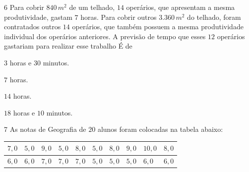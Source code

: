 \num{6}  Para cobrir $840\,m^2$ de um telhado, $14$ operários, que apresentam a
mesma produtividade, gastam $7$ horas. Para cobrir outros $3.360\,m^2$ do
telhado, foram contratados outros $14$ operários, que também possuem a
mesma produtividade individual dos operários anteriores. A previsão de
tempo que esses $12$ operários gastariam para realizar esse trabalho É de

\begin{escolha}
\item $3$ horas e $30$ minutos.
\item $7$ horas.
\item $14$ horas.
\item $18$ horas e $10$ minutos.
\end{escolha}




\num{7}  As notas de Geografia de $20$ alunos foram colocadas na tabela abaixo:


\begin{longtable}[]{@{}llllllllll@{}}
\toprule
$7,0$ & $5,0$ & $9,0$ & $5,0$ & $8,0$ & $5,0$ & $8,0$ & $9,0$ & $10,0$ &
$8,0$\tabularnewline
\midrule
\endhead
$6,0$ & $6,0$ & $7,0$ & $7,0$ & $7,0$ & $5,0$ & $5,0$ & $5,0$ & $6,0$ & $6,0$\tabularnewline
\bottomrule
\end{longtable}

